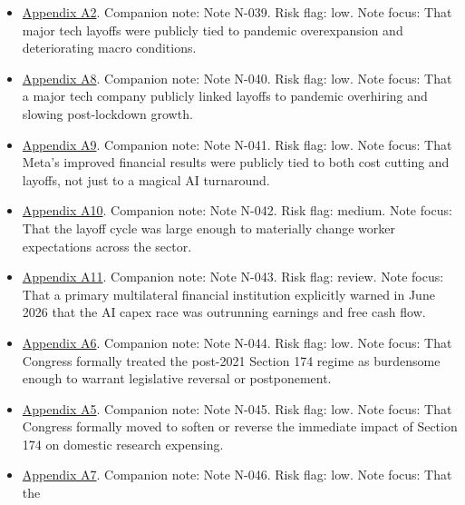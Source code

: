 \documentclass[
  american,
  11pt,
  letterpaper,
]{article}
\providecommand{\tightlist}{%
  \setlength{\itemsep}{0pt}\setlength{\parskip}{0pt}}
\begin{document}
\begin{itemize}
\tightlist
\item
  \hyperref[appendix-a2-amazon-salesforce-jettison-jobs-in-latest-tech-worker-purge]{Appendix
  A2}. Companion note: Note N-039. Risk flag: low. Note focus: That
  major tech layoffs were publicly tied to pandemic overexpansion and
  deteriorating macro conditions.
\item
  \hyperref[appendix-a8-meta-posts-lower-q4-profit-announces-huge-stock-buyback]{Appendix
  A8}. Companion note: Note N-040. Risk flag: low. Note focus: That a
  major tech company publicly linked layoffs to pandemic overhiring and
  slowing post-lockdown growth.
\item
  \hyperref[appendix-a9-meta-posts-sharp-profit-revenue-increase-in-q4-thanks-to-cost-cuts-and-advertising-rebound]{Appendix
  A9}. Companion note: Note N-041. Risk flag: low. Note focus: That
  Meta's improved financial results were publicly tied to both cost
  cutting and layoffs, not just to a magical AI turnaround.
\item
  \hyperref[appendix-a10-big-tech-layoffs-shattered-industry-worker-confidence]{Appendix
  A10}. Companion note: Note N-042. Risk flag: medium. Note focus: That
  the layoff cycle was large enough to materially change worker
  expectations across the sector.
\item
  \hyperref[appendix-a11-annual-economic-report-2026]{Appendix A11}.
  Companion note: Note N-043. Risk flag: review. Note focus: That a
  primary multilateral financial institution explicitly warned in June
  2026 that the AI capex race was outrunning earnings and free cash
  flow.
\item
  \hyperref[appendix-a6-h-r-7024-tax-relief-for-american-families-and-workers-act-of-2024-crs-summary]{Appendix
  A6}. Companion note: Note N-044. Risk flag: low. Note focus: That
  Congress formally treated the post-2021 Section 174 regime as
  burdensome enough to warrant legislative reversal or postponement.
\item
  \hyperref[appendix-a5-h-r-7024-tax-relief-for-american-families-and-workers-act-of-2024]{Appendix
  A5}. Companion note: Note N-045. Risk flag: low. Note focus: That
  Congress formally moved to soften or reverse the immediate impact of
  Section 174 on domestic research expensing.
\item
  \hyperref[appendix-a7-h-r-7024-text-deduction-for-domestic-research-and-experimental-expenditures]{Appendix
  A7}. Companion note: Note N-046. Risk flag: low. Note focus: That the

\end{itemize}
\end{document}
